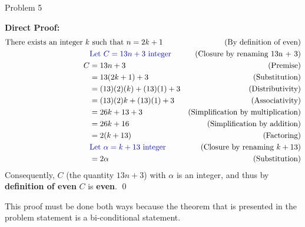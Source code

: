 \begin{problem}{Problem 5}
\begin{Highlight}[Solution]
        \textbf{Direct Proof:} \newline
        \begin{align*}
            \text{There exists an integer } k & \text{ such that } n = 2k + 1 & \text{(By definition of even)} \\
            & \textcolor{blue}{\text{Let } C = 13n + 3 \text{ integer}} & \text{(Closure by renaming 13n + 3)} \\
            C & = 13n + 3 & \text{(Premise)} \\
            & = 13(2k + 1) + 3 & \text{(Substitution)} \\
            & = (13)(2)(k) + (13)(1) + 3 & \text{(Distributivity)} \\
            & = (13)(2)k + (13)(1) + 3 & \text{(Associativity)} \\
            & = 26k + 13 + 3 & \text{(Simplification by multiplication)} \\
            & = 26k + 16 & \text{(Simplification by addition)} \\
            & = 2(k + 13) & \text{(Factoring)} \\
            & \textcolor{blue}{\text{Let } \alpha = k + 13 \text{ integer}} & \text{(Closure by renaming $k + 13$)} \\
            & = 2\alpha & \text{(Substitution)} \\
        \end{align*}
        Consequently, $C$ (the quantity $13n + 3$) with $\alpha$ is an integer, and thus by \textbf{definition of even} $C$ is \textbf{even}. \qed \vspace*{1em}

        This proof must be done both ways because the theorem that is presented in the problem statement is a bi-conditional statement.
    \end{Highlight}
\end{problem}

